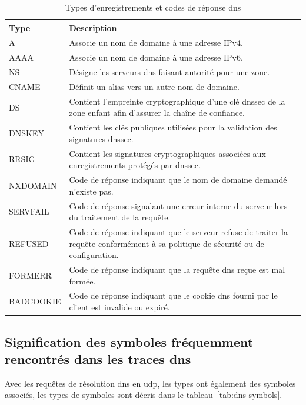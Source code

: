 \documentclass[12pt, a4paper]{report}
\begin{document}
	\begin{table}[ht]
		\centering
		\caption{Types d'enregistrements et codes de réponse \gls{dns}}
		\label{tab:dns-types}
		\begin{tabular}{p{3cm} p{10cm}}
		\toprule
		\textbf{Type} & \textbf{Description} \\
		\midrule
		A & Associe un nom de domaine à une adresse IPv4. \\
		AAAA & Associe un nom de domaine à une adresse IPv6. \\
		NS & Désigne les serveurs \gls{dns} faisant autorité pour une zone. \\
		CNAME & Définit un alias vers un autre nom de domaine. \\
		DS & Contient l'empreinte cryptographique d'une clé \gls{dnssec} de la zone enfant afin d'assurer la chaîne de confiance. \\
		DNSKEY & Contient les clés publiques utilisées pour la validation des signatures \gls{dnssec}. \\
		RRSIG & Contient les signatures cryptographiques associées aux enregistrements protégés par \gls{dnssec}. \\
		NXDOMAIN & Code de réponse indiquant que le nom de domaine demandé n'existe pas. \\
		SERVFAIL & Code de réponse signalant une erreur interne du serveur lors du traitement de la requête. \\
		REFUSED & Code de réponse indiquant que le serveur refuse de traiter la requête conformément à sa politique de sécurité ou de configuration. \\
		FORMERR & Code de réponse indiquant que la requête \gls{dns} reçue est mal formée. \\
		BADCOOKIE & Code de réponse indiquant que le cookie \gls{dns} fourni par le client est invalide ou expiré. \\
		\bottomrule
		\end{tabular}
	\end{table}

	\subsection*{Signification des symboles fréquemment rencontrés dans les traces \gls{dns}}

	Avec les requêtes de résolution \gls{dns} en \gls{udp}, les types ont également des symboles associés, les types de symboles sont décris dans le tableau~\ref{tab:dns-symbols}.
\end{document}
